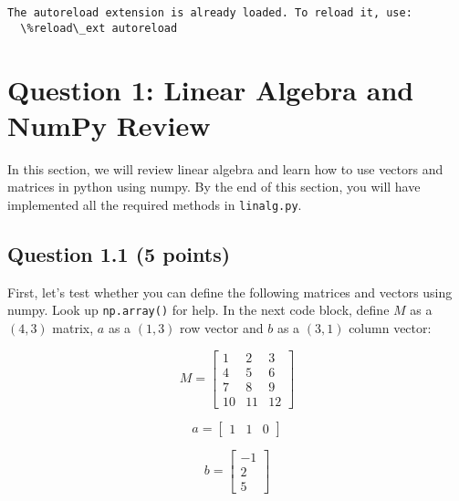 \documentclass[11pt]{article}
\begin{document}
    \begin{Verbatim}[commandchars=\\\{\}]
The autoreload extension is already loaded. To reload it, use:
  \%reload\_ext autoreload
    \end{Verbatim}

    \hypertarget{question-1-linear-algebra-and-numpy-review}{%
\section{Question 1: Linear Algebra and NumPy
Review}\label{question-1-linear-algebra-and-numpy-review}}

In this section, we will review linear algebra and learn how to use
vectors and matrices in python using numpy. By the end of this section,
you will have implemented all the required methods in
\texttt{linalg.py}.

    \hypertarget{question-1.1-5-points}{%
\subsection{Question 1.1 (5 points)}\label{question-1.1-5-points}}

First, let's test whether you can define the following matrices and
vectors using numpy. Look up \texttt{np.array()} for help. In the next
code block, define \(M\) as a \((4, 3)\) matrix, \(a\) as a \((1, 3)\)
row vector and \(b\) as a \((3, 1)\) column vector:

\[M = \begin{bmatrix}
1 & 2 & 3 \\
4 & 5 & 6 \\
7 & 8 & 9 \\
10 & 11 & 12 \end{bmatrix}
\]

\[a = \begin{bmatrix}
1 & 1 & 0
\end{bmatrix}
\]

\[b = \begin{bmatrix}
-1 \\ 2 \\ 5
\end{bmatrix}  
\]
\end{document}
